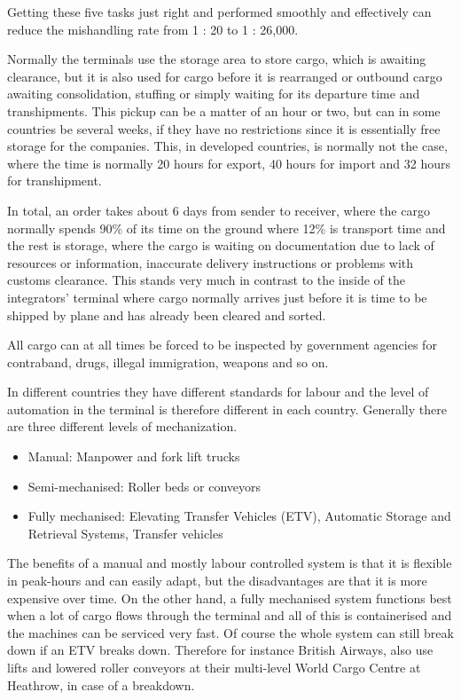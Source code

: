 Getting these five tasks just right and performed smoothly and effectively can reduce the mishandling rate from 1 : 20 to 1 : 26,000.

Normally the terminals use the storage area to store cargo, which is awaiting clearance, but it is also used for cargo before it is rearranged or outbound cargo awaiting consolidation, stuffing or simply waiting for its departure time and transhipments. This pickup can be a matter of an hour or two, but can in some countries be several weeks, if they have no restrictions since it is essentially free storage for the companies. This, in developed countries, is normally not the case, where the time is normally 20 hours for export, 40 hours for import and 32 hours for transhipment. %

In total, an order takes about 6 days from sender to receiver, where the cargo normally spends 90\% of its time on the ground where 12\% is transport time and the rest is storage, where the cargo is waiting on documentation due to lack of resources or information, inaccurate delivery instructions or problems with customs clearance. This stands very much in contrast to the inside of the integrators' terminal where cargo normally arrives just before it is time to be shipped by plane and has already been cleared and sorted.%

All cargo can at all times be forced to be inspected by government agencies for contraband, drugs, illegal immigration, weapons and so on.

In different countries they have different standards for labour and the level of automation in the terminal is therefore different in each country. Generally there are three different levels of mechanization.
\begin{itemize}
\item Manual: Manpower and fork lift trucks
\item Semi-mechanised: Roller beds or conveyors
\item Fully mechanised: Elevating Transfer Vehicles (ETV), Automatic Storage and Retrieval Systems, Transfer vehicles
\end{itemize}

The benefits of a manual and mostly labour controlled system is that it is flexible in peak-hours and can easily adapt, but the  disadvantages are that it is more expensive over time.
On the other hand, a fully mechanised system functions best when a lot of cargo flows through the terminal and all of this is containerised and the machines can be serviced very fast. Of course the whole system can still break down if an ETV breaks down.  Therefore for instance British Airways, also use lifts and lowered roller conveyors at their multi-level World Cargo Centre at Heathrow, in case of a breakdown.

